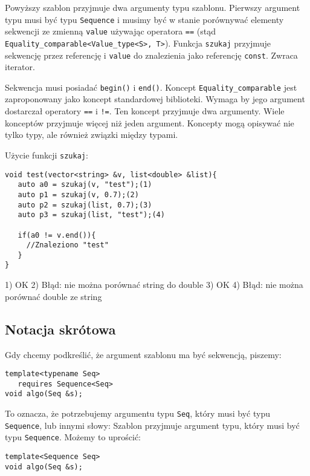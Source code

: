 \documentclass[11pt, a4paper]{article}
\begin{document}
Powyższy szablon przyjmuje dwa argumenty typu szablonu. Pierwszy argument typu musi być typu \verb#Sequence# i musimy być w stanie porównywać elementy sekwencji ze zmienną \verb#value# używając operatora \verb#==# (stąd \verb#Equality_comparable<Value_type<S>, T>#). Funkcja \verb#szukaj# przyjmuje sekwencję przez referencję i \verb#value# do znalezienia jako referencję \verb#const#. Zwraca iterator.

Sekwencja musi posiadać \verb#begin()# i \verb#end()#. Koncept \verb#Equality_comparable# jest zaproponowany jako koncept standardowej biblioteki. Wymaga by jego argument dostarczał operatory \verb#==# i \verb#!=#. Ten koncept przyjmuje dwa argumenty. Wiele konceptów przyjmuje więcej niż jeden argument. Koncepty mogą opisywać nie tylko typy, ale również związki między typami. \newline

Użycie funkcji \verb#szukaj#: \newline

\begin{lstlisting}[frame=single]
void test(vector<string> &v, list<double> &list){
   auto a0 = szukaj(v, "test");(1)
   auto p1 = szukaj(v, 0.7);(2)
   auto p2 = szukaj(list, 0.7);(3)
   auto p3 = szukaj(list, "test");(4)
   
   if(a0 != v.end()){
     //Znaleziono "test"
   }
}
\end{lstlisting}

1) OK
2) Błąd: nie można porównać string do double
3) OK
4) Błąd: nie można porównać double ze string

\subsection{Notacja skrótowa}
Gdy chcemy podkreślić, że argument szablonu ma być sekwencją, piszemy:

\begin{lstlisting}[frame=single]
template<typename Seq>
   requires Sequence<Seq>
void algo(Seq &s);

\end{lstlisting}

To oznacza, że potrzebujemy argumentu typu \verb#Seq#, który musi być typu \verb#Sequence#, lub innymi słowy: Szablon przyjmuje argument typu, który musi być typu \verb#Sequence#. Możemy to uprościć:

\begin{lstlisting}[frame=single]
template<Sequence Seq>
void algo(Seq &s);

\end{lstlisting}
\end{document}
